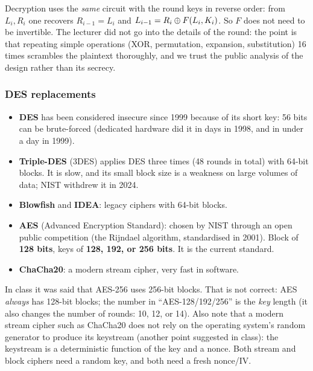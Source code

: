 \begin{remark}
Decryption uses the \emph{same} circuit with the round keys in reverse order: from $L_i, R_i$ one recovers $R_{i-1} = L_i$ and $L_{i-1} = R_i \oplus F(L_i, K_i)$. So $F$ does not need to be invertible. The lecturer did not go into the details of the round: the point is that repeating simple operations (XOR, permutation, expansion, substitution) 16 times scrambles the plaintext thoroughly, and we trust the public analysis of the design rather than its secrecy.
\end{remark}

\subsubsection{DES replacements}
\begin{itemize}
    \item \textbf{DES} has been considered insecure since 1999 because of its short key: 56 bits can be brute-forced (dedicated hardware did it in days in 1998, and in under a day in 1999).
    \item \textbf{Triple-DES} (3DES) applies DES three times (48 rounds in total) with 64-bit blocks. It is slow, and its small block size is a weakness on large volumes of data; NIST withdrew it in 2024.
    \item \textbf{Blowfish} and \textbf{IDEA}: legacy ciphers with 64-bit blocks.
    \item \textbf{AES} (Advanced Encryption Standard): chosen by NIST through an open public competition (the Rijndael algorithm, standardised in 2001). Block of \textbf{128 bits}, keys of \textbf{128, 192, or 256 bits}. It is the current standard.
    \item \textbf{ChaCha20}: a modern stream cipher, very fast in software.
\end{itemize}

\begin{remark}
In class it was said that AES-256 uses 256-bit blocks. That is not correct: AES \emph{always} has 128-bit blocks; the number in \enquote{AES-128/192/256} is the \emph{key} length (it also changes the number of rounds: 10, 12, or 14). Also note that a modern stream cipher such as ChaCha20 does not rely on the operating system's random generator to produce its keystream (another point suggested in class): the keystream is a deterministic function of the key and a nonce. Both stream and block ciphers need a random key, and both need a fresh nonce/IV.
\end{remark}

